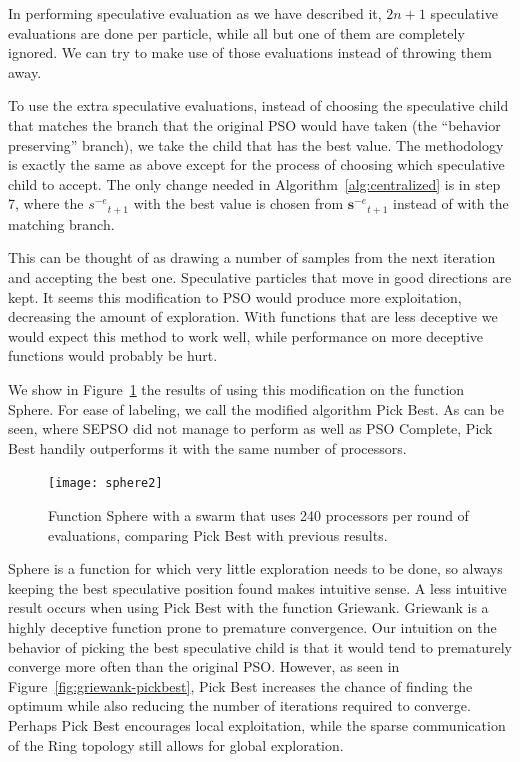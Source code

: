 \documentclass[journal,letterpaper]{IEEEtran}
\newcommand{\fig}[1]{Figure~\ref{fig:#1}}
\newcommand{\alg}[1]{Algorithm~\ref{alg:#1}}
\providecommand{\noeval}[1]{\ensuremath{#1^{-e}}}
\providecommand{\s}{\ensuremath{s}}
\providecommand{\sset}{\ensuremath{\mathbf{s}}}
\begin{document}
In performing speculative evaluation as we have described it, $2n+1$
speculative evaluations are done per particle, while all but one of them are
completely ignored.  We can try to make use of those evaluations instead of
throwing them away.  

To use the extra speculative evaluations, instead of choosing the speculative
child that matches the branch that the original PSO would have taken (the
``behavior preserving'' branch), we take the child that has the best value.
The methodology is exactly the same as above except for the process of choosing
which speculative child to accept.  The only change needed in \alg{centralized}
is in step 7, where the $\noeval{\s}_{t+1}$ with the best value is chosen from
$\noeval{\sset}_{t+1}$ instead of with the matching branch.

This can be thought of as drawing a number of samples from the next iteration
and accepting the best one.  Speculative particles that move in good directions
are kept.  It seems this modification to PSO would produce more exploitation,
decreasing the amount of exploration.  With functions that are less deceptive
we would expect this method to work well, while performance on more deceptive
functions would probably be hurt.

We show in \fig{sphere-pickbest} the results of using this modification on the
function Sphere.  For ease of labeling, we call the modified algorithm Pick
Best.  As can be seen, where SEPSO did not manage to perform as well as PSO
Complete, Pick Best handily outperforms it with the same number of processors.

\begin{figure}
  \centering
  \texttt{[image: sphere2]}
  \caption{Function Sphere with a swarm that uses 240 processors per round of
  evaluations, comparing Pick Best with previous results.}
  \label{fig:sphere-pickbest}
\end{figure}

Sphere is a function for which very little exploration needs to be done, so
always keeping the best speculative position found makes intuitive sense.  A
less intuitive result occurs when using Pick Best with the function Griewank.
Griewank is a highly deceptive function prone to premature convergence.  Our
intuition on the behavior of picking the best speculative child is that it
would tend to prematurely converge more often than the original PSO.  However,
as seen in \fig{griewank-pickbest}, Pick Best increases the chance of finding
the optimum while also reducing the number of iterations required to converge.
Perhaps Pick Best encourages local exploitation, while the sparse communication
of the Ring topology still allows for global exploration.
\end{document}
